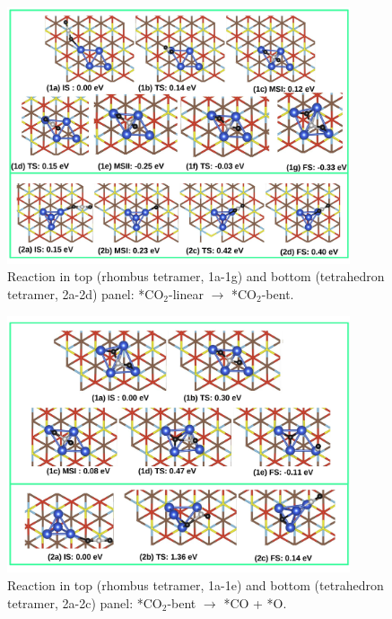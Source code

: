 \begin{figure}
  \begin{center}
    \includegraphics[width=0.9\textwidth]{./Appendix3/figures_si/p_102.jpg}
  \end{center}
    \caption{Reaction in top (rhombus tetramer, 1a-1g) and bottom (tetrahedron tetramer, 2a-2d) panel: *CO$_2$-linear $\rightarrow$ *CO$_2$-bent.   }
  \label{fig:si-102}
\end{figure}

\begin{figure}
  \begin{center}
    \includegraphics[width=0.9\textwidth]{./Appendix3/figures_si/p_103.jpg}
  \end{center}
    \caption{Reaction in top (rhombus tetramer, 1a-1e) and bottom (tetrahedron tetramer, 2a-2c) panel: *CO$_2$-bent $\rightarrow$ *CO + *O.   }
  \label{fig:si-103}
\end{figure}

